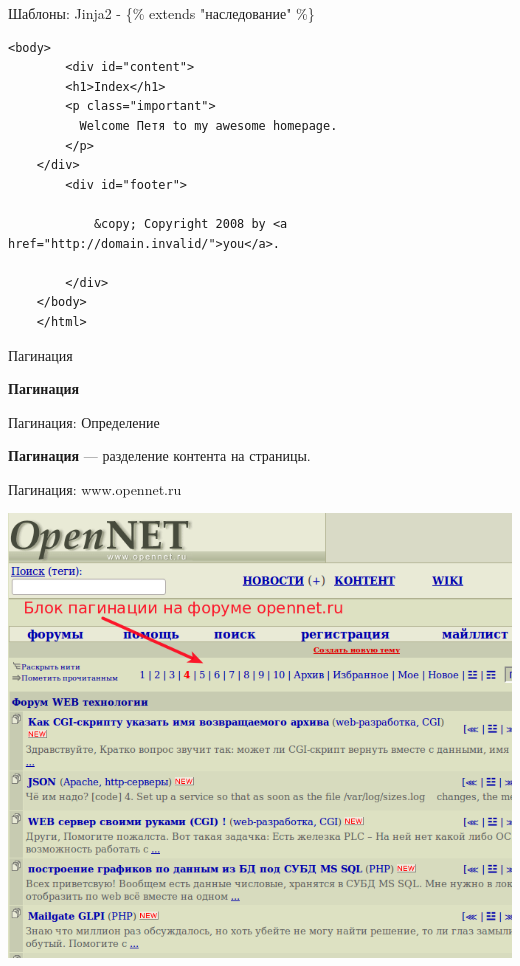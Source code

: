\begin{frame}[fragile]{Шаблоны: Jinja2 - \{\% extends "наследование" \%\}}

  \begin{lstlisting}[style=python]
    <body>
        <div id="content">
        <h1>Index</h1>
        <p class="important">
          Welcome Петя to my awesome homepage.
        </p>
    </div>
        <div id="footer">

            &copy; Copyright 2008 by <a href="http://domain.invalid/">you</a>.

        </div>
    </body>
    </html>
  \end{lstlisting}

\end{frame}

\begin{frame}{Пагинация}

  \textbf{Пагинация}

\end{frame}


\begin{frame}{Пагинация: Определение}

  \textbf{Пагинация} --- разделение контента на страницы.

\end{frame}

\begin{frame}{Пагинация: www.opennet.ru}

  \begin{center}
    \includegraphics[width=\textwidth]{media/opennet.png}
  \end{center}

\end{frame}

